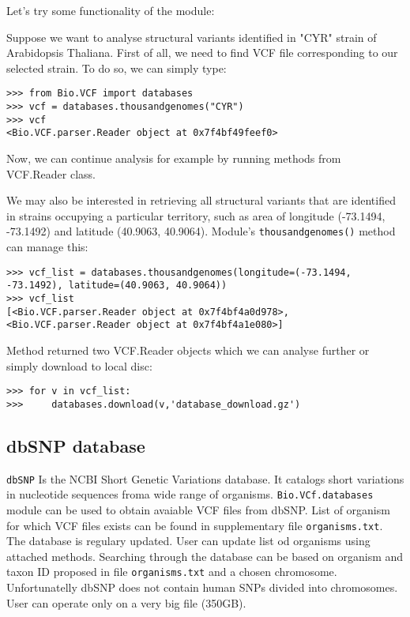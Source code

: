 \noindent Let's try some functionality of the module:

\noindent Suppose we want to analyse structural variants identified in "CYR" strain of Arabidopsis Thaliana. First of all,
we need to find VCF file corresponding to our selected strain. To do so, we can simply type:


\begin{verbatim}
>>> from Bio.VCF import databases
>>> vcf = databases.thousandgenomes("CYR")
>>> vcf
<Bio.VCF.parser.Reader object at 0x7f4bf49feef0>

\end{verbatim}


\noindent Now, we can continue analysis for example by running methods from VCF.Reader class.


\noindent We may also be interested in retrieving all structural variants that are identified in strains occupying a particular
territory, such as area of longitude (-73.1494, -73.1492) and latitude (40.9063, 40.9064). Module's \verb|thousandgenomes()|
method can manage this:


\begin{verbatim}
>>> vcf_list = databases.thousandgenomes(longitude=(-73.1494, -73.1492), latitude=(40.9063, 40.9064))
>>> vcf_list
[<Bio.VCF.parser.Reader object at 0x7f4bf4a0d978>, <Bio.VCF.parser.Reader object at 0x7f4bf4a1e080>]

\end{verbatim}


\noindent Method returned two VCF.Reader objects which we can analyse further or simply download to local disc:


\begin{verbatim}
>>> for v in vcf_list:
>>>     databases.download(v,'database_download.gz')
\end{verbatim}

\subsection{dbSNP database}

\verb|dbSNP| Is the NCBI Short Genetic Variations database. It catalogs short variations in nucleotide sequences froma wide range of organisms. 
\verb|Bio.VCf.databases| module can be used to obtain avaiable VCF files from dbSNP. List of organism for which VCF files exists can be found in supplementary file \verb|organisms.txt|. The database is regulary updated. User can update list od organisms using attached methods. Searching through the database can be based on organism and taxon ID proposed in file \verb|organisms.txt| and a chosen chromosome. Unfortunatelly dbSNP does not contain human SNPs divided into chromosomes. User can operate only on a very big file (350GB).

